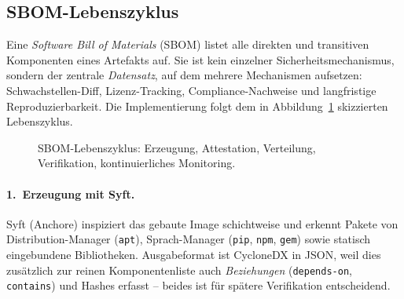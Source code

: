 \documentclass[12pt, a4paper]{scrartcl}
\begin{document}
\subsection{SBOM-Lebenszyklus}\label{sec:sbomlifecycle}
Eine \emph{Software Bill of Materials} (SBOM) listet alle direkten und
transitiven Komponenten eines Artefakts auf. Sie ist kein einzelner
Sicherheitsmechanismus, sondern der zentrale \emph{Datensatz}, auf dem
mehrere Mechanismen aufsetzen: Schwachstellen-Diff, Lizenz-Tracking,
Compliance-Nachweise und langfristige Reproduzierbarkeit. Die
Implementierung folgt dem in Abbildung~\ref{fig:sbom} skizzierten
Lebenszyklus.

\begin{figure}[h]
\centering
{}
\caption{SBOM-Lebenszyklus: Erzeugung, Attestation, Verteilung,
Verifikation, kontinuierliches Monitoring.}
\label{fig:sbom}
\end{figure}

\paragraph{1.~Erzeugung mit Syft.}
Syft (Anchore) inspiziert das gebaute Image schichtweise und erkennt
Pakete von Distribution-Manager (\texttt{apt}), Sprach-Manager
(\texttt{pip}, \texttt{npm}, \texttt{gem}) sowie statisch eingebundene
Bibliotheken. Ausgabeformat ist CycloneDX in JSON, weil dies zusätzlich
zur reinen Komponentenliste auch \emph{Beziehungen} (\texttt{depends-on},
\texttt{contains}) und Hashes erfasst -- beides ist für spätere
Verifikation entscheidend.
\end{document}

